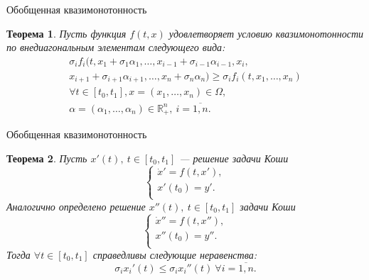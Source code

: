 \documentclass[envcountsect]{beamer}
\newtheorem{rutheorem}{Теорема}
\theoremstyle{definition}
\begin{document}
	\begin{frame}{Обобщенная квазимонотонность}
		\begin{rutheorem}
			Пусть функция \(f(t, x)\) удовлетворяет условию квазимонотонности по внедиагональным элементам следующего вида:
			\begin{multline}
				\sigma_i f_i(t, x_1 + \sigma_1 \alpha_1,\dots, x_{i - 1} + \sigma_{i-1} \alpha_{i-1}, x_i,\\ x_{i+1} + \sigma_{i+1} \alpha_{i+1}, \dots, x_n + \sigma_n \alpha_n) \ge \sigma_i f_i(t, x_1,\dots,x_n)
				\\ \forall t \in [t_0, t_1], x = (x_1,\dots,x_n) \in \Omega,\\ \alpha = (\alpha_1,\dots,\alpha_n) \in \mathbb{R}^n_+,\ i = \overline{1, n}.
			\end{multline}
		\end{rutheorem}
	\end{frame}
	
	\begin{frame}{Обобщенная квазимонотонность}
		\begin{rutheorem}
			Пусть \(x'(t),\ t \in [t_0, t_1]\) --- решение задачи Коши
			\begin{equation}
				\begin{cases} \label{zk1}
					\dot x' = f(t, x'), \\
					x'(t_0) = y'. \\
				\end{cases}
			\end{equation}
			Аналогично определено решение \(x''(t),\ t \in [t_0, t_1]\) задачи Коши
			\begin{equation}
				\begin{cases} \label{zk2}
					\dot x'' = f(t, x''), \\
					x''(t_0) = y''. \\
				\end{cases}
			\end{equation}
			Тогда \(\forall t \in [t_0,t_1]\) справедливы следующие неравенства:
			\begin{equation}
				\sigma_i x_i'(t) \le \sigma_i x_i''(t)\ \forall i = \overline{1,n}.
			\end{equation}
		\end{rutheorem}
	\end{frame}
\end{document}
